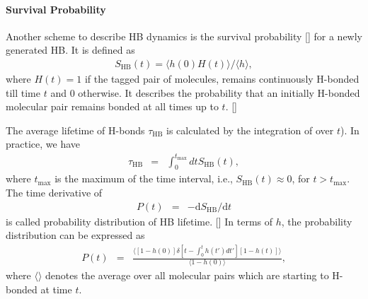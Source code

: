 \paragraph{Survival Probability}
Another scheme to describe HB dynamics is the survival probability [\cite{AC00}] for a newly generated HB.
It is defined as
\begin{eqnarray}
S_{\text{HB}}(t)=\langle h(0)H(t) \rangle/\langle h\rangle 
\label{eq:S_HB},
\end{eqnarray}
where $H(t)=1$ if the tagged pair of molecules, remains continuously H-bonded till time $t$ 
and 0 otherwise.  It describes the probability that an initially H-bonded molecular pair 
remains bonded at all times up to $t$. [\cite{Chowdhuri2006}]

The average lifetime of H-bonds $\tau_{\text{HB}}$ is calculated by the integration of \SHB over $t$). In practice, we have 
\begin{eqnarray}
  \tau_{\text{HB}} &=& \int_0^{t_{\text{max}}} dt S_{\text{HB}}(t),
\label{eq:calculate_hb_lifetime}
\end{eqnarray}
where $t_{\text{max}}$ is the maximum of the time interval, i.e., $S_{\text{HB}}(t)\approx 0$, for $t > t_{\text{max}}$.
%
The time derivative of \SHB
\begin{eqnarray}
P(t) &=& -\text{d}S_{\text{HB}}/\text{d}t
\label{eq:P_of_t}
\end{eqnarray}
is called probability distribution of HB lifetime. [\cite{Sciortino1990prl,FWS99}]
In terms of $h$, the probability distribution can be expressed as
\begin{eqnarray}
P(t) &=& \frac{\langle [1-h(0)]\delta [t-\int_0^t h(t')dt'][1-h(t)]\rangle}{\langle 1-h(0)\rangle},
\label{eq:P_of_t}
\end{eqnarray}
where $\langle \rangle$ denotes the average over all molecular pairs which are starting to H-bonded at time $t$.

%
